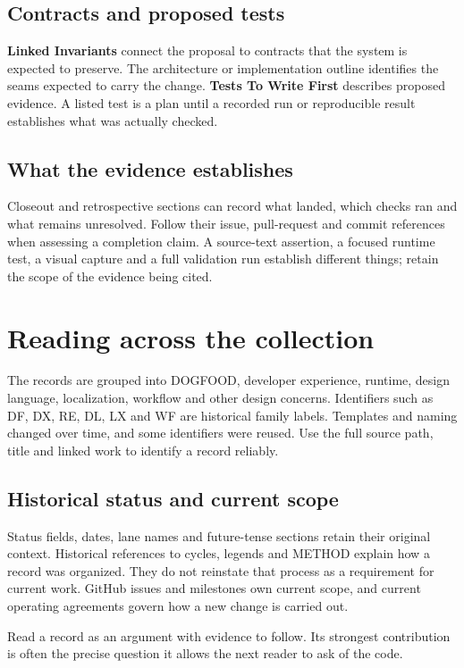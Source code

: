 \subsection*{Contracts and proposed tests}

\textbf{Linked Invariants} connect the proposal to contracts that the system is expected to preserve. The architecture or implementation outline identifies the seams expected to carry the change. \textbf{Tests To Write First} describes proposed evidence. A listed test is a plan until a recorded run or reproducible result establishes what was actually checked.

\subsection*{What the evidence establishes}

Closeout and retrospective sections can record what landed, which checks ran and what remains unresolved. Follow their issue, pull-request and commit references when assessing a completion claim. A source-text assertion, a focused runtime test, a visual capture and a full validation run establish different things; retain the scope of the evidence being cited.

\section*{Reading across the collection}

The records are grouped into DOGFOOD, developer experience, runtime, design language, localization, workflow and other design concerns. Identifiers such as DF, DX, RE, DL, LX and WF are historical family labels. Templates and naming changed over time, and some identifiers were reused. Use the full source path, title and linked work to identify a record reliably.

\subsection*{Historical status and current scope}

Status fields, dates, lane names and future-tense sections retain their original context. Historical references to cycles, legends and METHOD explain how a record was organized. They do not reinstate that process as a requirement for current work. GitHub issues and milestones own current scope, and current operating agreements govern how a new change is carried out.

Read a record as an argument with evidence to follow. Its strongest contribution is often the precise question it allows the next reader to ask of the code.
